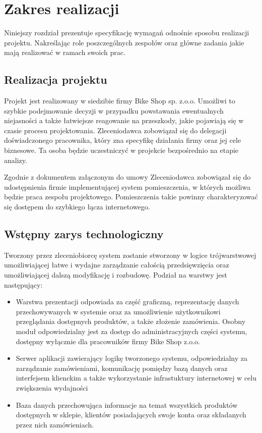 \section{Zakres realizacji}

Niniejszy rozdział prezentuje specyfikację wymagań odnośnie sposobu realizacji
projektu. Nakreślając role poszczególnych zespołów oraz główne zadania jakie
mają realizować w ramach swoich prac.

\subsection{Realizacja projektu}

Projekt jest realizowany w siedzibie firmy Bike Shop sp. z.o.o.
Umożliwi to szybkie podejmowanie decyzji w przypadku powstawania
ewentualnych niejasności a także łatwiejsze reagowanie na przeszkody,
jakie pojawiają się w czasie procesu projektowania. 
Zleceniodawca zobowiązał się do delegacji doświadczonego pracownika, który zna
specyfikę działania firmy oraz jej cele biznesowe. Ta osoba będzie uczestniczyć
w projekcie bezpośrednio na etapie analizy.

Zgodnie z dokumentem załączonym do umowy Zleceniodawca zobowiązał się do
udostępnienia firmie implementującej system pomieszczenia, w których
możliwa będzie praca zespołu projektowego. Pomieszczenia takie
powinny charakteryzować się dostępem do szybkiego łącza
internetowego. 

\subsection{Wstępny zarys technologiczny}
Tworzony przez zleceniobiorcę system zostanie stworzony w logice
trójwarstwowej umożliwiającej łatwe i wydajne zarządzanie całością
przedsięwzięcia oraz umożliwiającej dalszą modyfikację i rozbudowę.
Podział na warstwy jest następujący:

\begin{itemize}
  \item Warstwa prezentacji odpowiada za część graficzną, reprezentację danych
  przechowywanych w systemie oraz za umożliwienie użytkownikowi przeglądania
  dostępnych produktów, a także złożenie zamówienia. Osobny moduł odpowiedzialny
  jest za dostęp do administracyjnych części systemu, dostępny wyłącznie dla
  pracowników firmy Bike Shop z.o.o.
  \item Serwer aplikacji zawierający logikę tworzonego systemu, odpowiedzialny
  za zarządzanie zamówieniami, komunikację pomiędzy bazą danych oraz interfejsem
  klienckim a także wykorzystanie infrastuktury internetowej w celu zwiększenia
  wydajności
  \item Baza danych przechowująca informacje na temat wszystkich produktów
  dostępnych w sklepie, klientów posiadających swoje konta oraz składanych przez
  nich zamówieniach.
\end{itemize}

